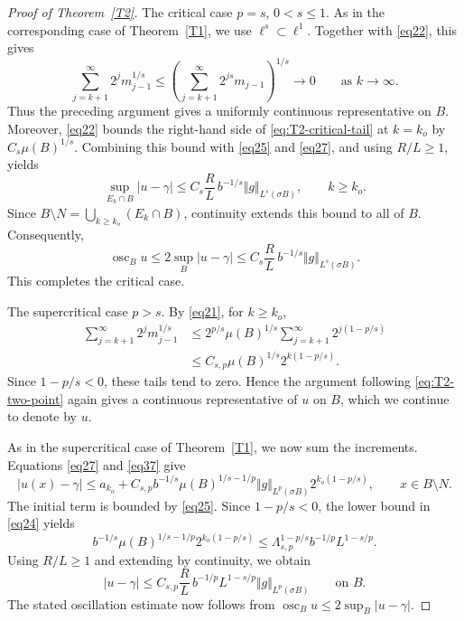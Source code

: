 \documentclass[10pt,a4paper]{amsart}
\begin{document}
\begin{proof}[Proof of Theorem~\ref{T2}]
\medskip
\noindent
{\sc The critical case $p=s$, $0<s\leq1$.}
As in the corresponding case of Theorem~\ref{T1}, we use
$\ell^s\subset\ell^1$. Together with \eqref{eq22}, this gives
\begin{equation}
\label{eq:T2-critical-tail}
 \sum_{j=k+1}^{\infty}2^jm_{j-1}^{1/s}
 \leq
 \left(\sum_{j=k+1}^{\infty}2^{js}m_{j-1}\right)^{1/s}
 \longrightarrow0
 \qquad\text{as }k\to\infty.
\end{equation}
Thus the preceding argument gives a uniformly continuous
representative on $B$.
Moreover, \eqref{eq22} bounds the right-hand side of
\eqref{eq:T2-critical-tail} at $k=k_o$ by $C_s\mu(B)^{1/s}$.
Combining this bound with \eqref{eq25} and \eqref{eq27}, and using
$R/L\geq1$, yields
\begin{equation}
\label{eq34}
 \sup_{E_k\cap B}|u-\gamma|
 \leq C_s\frac RL\,b^{-1/s}\Vert g\Vert_{L^s(\sigma B)},
 \qquad k\geq k_o.
\end{equation}
Since $B\setminus N=\bigcup_{k\geq k_o}(E_k\cap B)$,
continuity extends this bound to all of $B$. Consequently,
\[
 \operatorname{osc}_B u
 \leq 2\sup_B|u-\gamma|
 \leq C_s\frac RL\,b^{-1/s}\Vert g\Vert_{L^s(\sigma B)}.
\]
This completes the critical case.


\medskip
\noindent
{\sc The supercritical case $p>s$.}
By \eqref{eq21}, for $k\geq k_o$,
\begin{equation}
\label{eq37}
\begin{split}
 \sum_{j=k+1}^{\infty}2^jm_{j-1}^{1/s}
 &\leq 2^{p/s}\mu(B)^{1/s}
        \sum_{j=k+1}^{\infty}2^{j(1-p/s)}\\
 &\leq C_{s,p}\mu(B)^{1/s}2^{k(1-p/s)}.
\end{split}
\end{equation}
Since $1-p/s<0$, these tails tend to zero. Hence the argument
following \eqref{eq:T2-two-point} again gives a continuous
representative of $u$ on $B$, which we continue to denote by $u$.


As in the supercritical case of Theorem~\ref{T1}, we now sum the
increments. Equations \eqref{eq27} and \eqref{eq37} give
\[
 |u(x)-\gamma|\leq a_{k_o}
 +C_{s,p}b^{-1/s}\mu(B)^{1/s-1/p}
 \Vert g\Vert_{L^p(\sigma B)}2^{k_o(1-p/s)},
 \qquad x\in B\setminus N.
\]
The initial term is bounded by \eqref{eq25}. Since $1-p/s<0$,
the lower bound in \eqref{eq24} yields
\[
 b^{-1/s}\mu(B)^{1/s-1/p}2^{k_o(1-p/s)}
 \leq \Lambda_{s,p}^{1-p/s}b^{-1/p}L^{1-s/p}.
\]
Using $R/L\geq1$ and extending by continuity, we obtain
\begin{equation}
\label{eq38}
 |u-\gamma|
 \leq C_{s,p}\frac RL\,b^{-1/p}L^{1-s/p}
 \Vert g\Vert_{L^p(\sigma B)}
 \qquad\text{on }B.
\end{equation}
The stated oscillation estimate now follows from
$\operatorname{osc}_B u\leq2\sup_B|u-\gamma|$.


\end{proof}
\end{document}
